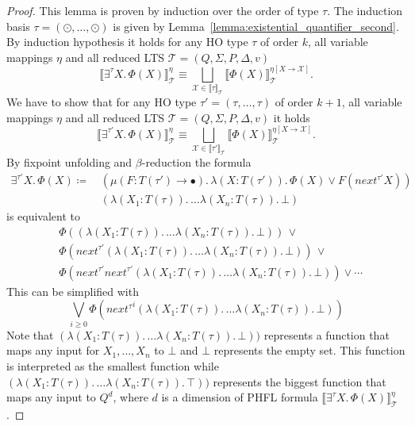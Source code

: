 \begin{proof}
    This lemma is proven by induction over the order of type $\tau$. The induction basis $\tau = (\odot, \dots, \odot)$ is given by Lemma~\ref{lemma:existential_quantifier_second}. By induction hypothesis it holds for any HO type $\tau$ of order $k$, all variable mappings $\eta$ and all reduced LTS $\mathcal{T} = (Q, \Sigma, P, \Delta, v)$
    \[\llbracket \exists^\tau X.\,\Phi(X)\rrbracket^\eta_\mathcal{T} \equiv \underset{\mathcal{X} \in \llbracket \tau
    \rrbracket_\mathcal{T}}{\bigsqcup} \llbracket \Phi(X) \rrbracket^{\eta[X\rightarrow \mathcal{X}]}_\mathcal{T}.\]
    We have to show that for any HO type $\tau'=(\tau, \dots, \tau)$ of order $k+1$, all variable mappings $\eta$ and all reduced LTS $\mathcal{T} = (Q, \Sigma, P, \Delta, v)$ it holds
    \[\llbracket \exists^{\tau'} X.\,\Phi(X)\rrbracket^\eta_\mathcal{T} \equiv \underset{\mathcal{X} \in \llbracket \tau'
    \rrbracket_\mathcal{T}}{\bigsqcup} \llbracket \Phi(X) \rrbracket^{\eta[X\rightarrow \mathcal{X}]}_\mathcal{T}.\]    
     By fixpoint unfolding and $\beta$-reduction the formula
    \begin{align*}
        \exists^{\tau'}X.\, \Phi(X) \coloneqq &\,(\mu (F \colon T(\tau') \rightarrow \bullet).\, \lambda (X \colon T(\tau')).\,
        \Phi(X)
        \vee F(next^{\tau'} X))\\&\,(\lambda (X_1 \colon T(\tau)).\, \dots \lambda (X_n \colon T(\tau)).\,\bot)
    \end{align*}    
    is equivalent to
    \begin{align*}
        &\Phi((\lambda (X_1 \colon T(\tau)).\, \dots \lambda (X_n \colon T(\tau)).\,\bot))\, \vee \\
        &\Phi(next^{\tau'} (\lambda (X_1 \colon T(\tau)).\, \dots \lambda (X_n \colon T(\tau)).\,\bot))\, \vee \\
        & \Phi(next^{\tau'} next^{\tau'} (\lambda (X_1 \colon T(\tau)).\, \dots \lambda (X_n \colon T(\tau)).\,\bot)) \vee \dotsb
    \end{align*}    
    This can be simplified with
    \[\underset{i\geq0}{\bigvee} \Phi({next^{\tau}}^i (\lambda (X_1 \colon T(\tau)).\, \dots \lambda 
    (X_n \colon T(\tau)).\,\bot))\]
    Note that $(\lambda (X_1 \colon T(\tau)).\, \dots \lambda (X_n \colon T(\tau)).\,\bot))$ 
    represents a function that maps any input for $X_1, \dots, X_n$ to $\bot$ and $\bot$ 
    represents the empty set. This function is interpreted as the smallest function while $
    (\lambda (X_1 \colon T(\tau)).\, \dots \lambda (X_n \colon T(\tau)).\,\top))$ represents the 
    biggest function that maps any input to $Q^d$, where $d$ is a dimension of PHFL formula $
    \llbracket \exists^\tau X.\,\Phi(X)\rrbracket^\eta_\mathcal{T}$.
    

\end{proof}
